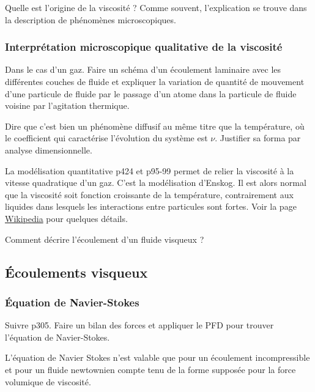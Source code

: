 \begin{transition}
Quelle est l'origine de la viscosité ?
Comme souvent, l'explication se trouve dans la description de phénomènes microscopiques.
\end{transition}

\subsubsection{Interprétation microscopique qualitative de la viscosité}

Dans le cas d'un gaz.
Faire un schéma d'un écoulement laminaire avec les différentes couches de fluide et expliquer la variation de quantité de mouvement d'une particule de fluide par le passage d'un atome dans la particule de fluide voisine par l'agitation thermique.

Dire que c'est bien un phénomène diffusif au même titre que la température, où le coefficient qui caractérise l'évolution du système est $\nu$.
Justifier sa forma par analyse dimensionnelle.

\begin{remarque}
La modélisation quantitative \cite{Olivier2000} p424 et \cite{Guyon2001} p95-99 permet de relier la viscosité à la vitesse quadratique d'un gaz.
C'est la modélisation d'Enskog.
Il est alors normal que la viscosité soit fonction croissante de la température, contrairement aux liquides dans lesquels les interactions entre particules sont fortes.
Voir la page \href{https://fr.wikipedia.org/wiki/Viscosit\%C3\%A9#Viscosit\%C3\%A9_des_liquides}{Wikipedia} pour quelques détails.
\end{remarque}

\begin{transition}
Comment décrire l'écoulement d'un fluide visqueux ?
\end{transition}

\subsection{Écoulements visqueux}

\subsubsection{Équation de Navier-Stokes}

Suivre \cite{Sanz2016} p305.
Faire un bilan des forces et appliquer le PFD pour trouver l'équation de Navier-Stokes.
\begin{remarque}
L'équation de Navier Stokes n'est valable que pour un écoulement incompressible et pour un fluide newtownien compte tenu de la forme supposée pour la force volumique de viscosité.
\end{remarque}

